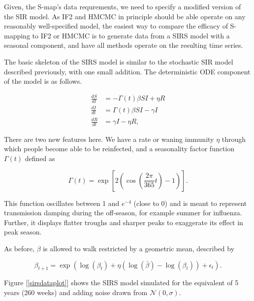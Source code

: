 	Given, the S-map's data requrements, we need to specify a modified version of the SIR model. As IF2 and HMCMC in principle should be able operate on any reasonably well-specified model, the easiest way to compare the efficacy of S-mapping to IF2 or HMCMC is to generate data from a SIRS model with a seasonal component, and have all methods operate on the resulting time series.

	The basic skeleton of the SIRS model is similar to the stochastic SIR model described previously, with one small addition. The deterministic ODE component of the model is as follows.

	\begin{equation}
		\begin{aligned}
			\frac{dS}{dt} & = - \Gamma(t) \beta S I + \eta R \\
			\frac{dI}{dt} & = \Gamma(t) \beta S I - \gamma I \\
			\frac{dR}{dt} & = \gamma I - \eta R,
		\end{aligned}
	\end{equation}

	There are two new features here. We have a rate or waning immunity $\eta$ through which people become able to be reinfected, and a seasonality factor function $\Gamma (t)$ defined as

	\begin{equation}
		\Gamma(t) = \exp \left[ 2 \left( \cos \left(  \frac{2 \pi}{365} t \right) - 1 \right) \right].
	\end{equation}

	This function oscillates between 1 and $e^{-4}$ (close to 0) and is meant to represent transmission damping during the off-season, for example summer for influenza. Further, it displays flatter troughs and sharper peaks to exaggerate its effect in peak season.

	As before, $\beta$ is allowed to walk restricted by a geometric mean, described by

	\begin{equation}
		\beta_{t+1} = \exp \left( \log(\beta_{t}) + \eta (\log(\bar{\beta}) - \log(\beta_{t})) + \epsilon_{t} \right).
	\end{equation}

	Figure [\ref{sirsdataplot}] shows the SIRS model simulated for the equivalent of 5 years (260 weeks) and adding noise drawn from $\mathcal{N}(0,\sigma)$.

